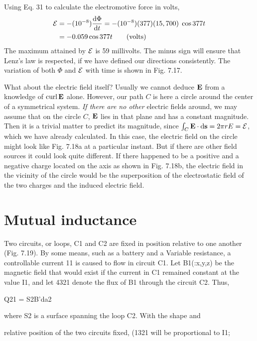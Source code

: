 Using Eq. 31 to calculate the electromotive force in volts,
\begin{align}
  \mathcal{E} &= -(10^{-8})\frac{\textup{d}\Phi}{\textup{d} t} = -(10^{-8})(377)(15,700)\;\cos 377 t \\
       &= -0.059\cos 377 t \qquad \text{(volts)}
\end{align}
The maximum attained by $\mathcal{E}$ is 59 millivolts. The minus sign will
ensure that Lenz's law is respected, if we have defined our directions
consistently. The variation of both $\Phi$ and $\mathcal{E}$ with time is shown in
Fig. 7.17.

What about the electric field itself? Usually we cannot deduce
$\mathbf{E}$ from a knowledge of $\operatorname{curl}\mathbf{E}$ alone. However, our path $C$ is here a
circle around the center of a symmetrical system. \emph{If there are no
other} electric fields around, we may assume that on the circle $C$, $\mathbf{E}$ lies
in that plane and has a constant magnitude. Then it is a trivial
matter to predict its magnitude, since $\int_C \mathbf{E}\cdot\textup{d}\mathbf{s} = 2\pi r E = \mathcal{E}$, which
we have already calculated. In this case, the electric field on the
circle might look like Fig. 7.18a at a particular instant. But if there
are other field sources it could look quite different. If there happened
to be a positive and a negative charge located on the axis as shown
in Fig. 7.18b, the electric field in the vicinity of the circle would be
the superposition of the electrostatic field of the two charges and the
induced electric field.


\iffalse

\section{Mutual inductance}

Two circuits, or loops, C1 and C2 are fixed in position relative to
one another (Fig. 7.19). By some means, such as a battery and
a Variable resistance, a controllable current 11 is caused to flow in
circuit C1. Let B1(:x,y,z) be the magnetic field that would exist if
the current in C1 remained constant at the value I1, and let 4321 denote
the flux of B1 through the circuit C2. Thus,

\begin{equation}
\end{equation}
Q21 = S2B'da2 

where S2 is a surface spanning the loop C2. With the shape and

relative position of the two circuits fixed, (1321 will be proportional
to I1;


